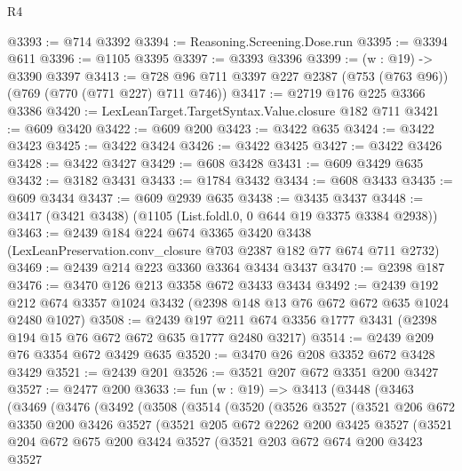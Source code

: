 \begin{lexlean}{R4}
\begin{coremodule}
@3393 := @714 @3392
@3394 := Reasoning.Screening.Dose.run
@3395 := @3394 @611
@3396 := @1105 @3395
@3397 := @3393 @3396
@3399 := (w : @19) -> @3390 @3397
@3413 := @728 @96 @711 @3397 @227 @2387 (@753 (@763 @96)) (@769 (@770 (@771 @227) @711 @746))
@3417 := @2719 @176 @225 @3366 @3386
@3420 := LexLeanTarget.TargetSyntax.Value.closure @182 @711
@3421 := @609 @3420
@3422 := @609 @200
@3423 := @3422 @635
@3424 := @3422 @3423
@3425 := @3422 @3424
@3426 := @3422 @3425
@3427 := @3422 @3426
@3428 := @3422 @3427
@3429 := @608 @3428
@3431 := @609 @3429 @635
@3432 := @3182 @3431
@3433 := @1784 @3432
@3434 := @608 @3433
@3435 := @609 @3434
@3437 := @609 @2939 @635
@3438 := @3435 @3437
@3448 := @3417 (@3421 @3438) (@1105 (List.foldl.{0, 0} @644 @19 @3375 @3384 @2938))
@3463 := @2439
    @184
    @224
    @674
    @3365
    @3420
    @3438
    (LexLeanPreservation.conv_closure @703 @2387 @182 @77 @674 @711 @2732)
@3469 := @2439 @214 @223 @3360 @3364 @3434 @3437
@3470 := @2398 @187
@3476 := @3470 @126 @213 @3358 @672 @3433 @3434
@3492 := @2439
    @192
    @212
    @674
    @3357
    @1024
    @3432
    (@2398 @148 @13 @76 @672 @672 @635 @1024 @2480 @1027)
@3508 := @2439
    @197
    @211
    @674
    @3356
    @1777
    @3431
    (@2398 @194 @15 @76 @672 @672 @635 @1777 @2480 @3217)
@3514 := @2439 @209 @76 @3354 @672 @3429 @635
@3520 := @3470 @26 @208 @3352 @672 @3428 @3429
@3521 := @2439 @201
@3526 := @3521 @207 @672 @3351 @200 @3427
@3527 := @2477 @200
@3633 := fun (w : @19) =>
  @3413
    (@3448
      (@3463
        (@3469
          (@3476
            (@3492
              (@3508
                (@3514
                  (@3520
                    (@3526
                      @3527
                      (@3521
                        @206
                        @672
                        @3350
                        @200
                        @3426
                        @3527
                        (@3521
                          @205
                          @672
                          @2262
                          @200
                          @3425
                          @3527
                          (@3521
                            @204
                            @672
                            @675
                            @200
                            @3424
                            @3527
                            (@3521
                              @203
                              @672
                              @674
                              @200
                              @3423
                              @3527

\end{coremodule}
\end{lexlean}
